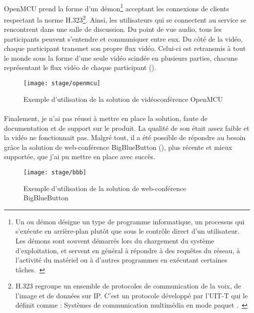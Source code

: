 \paragraph{}
OpenMCU prend la forme d'un démon\footnote{Un  ou démon désigne un type de programme informatique, un processus qui s'exécute en arrière-plan plutôt que sous le contrôle direct d'un utilisateur. Les démons sont souvent démarrés lors du chargement du système d'exploitation, et servent en général à répondre à des requêtes du réseau, à l'activité du matériel ou à d'autres programmes en exécutant certaines tâches.~\cite{demon}} acceptant les connexions de clients respectant la norme H.323\footnote{H.323 regroupe un ensemble de protocoles de communication de la voix, de l'image et de données sur IP. C'est un protocole développé par l'UIT-T qui le définit comme : \og Systèmes de communication multimédia en mode paquet \fg.~\cite{h323}}.
Ainsi, les utilisateurs qui se connectent au service se rencontrent dans une salle de discussion.
Du point de vue audio, tous les participants peuvent s'entendre et communiquer entre eux.
Du côté de la vidéo, chaque participant transmet son propre flux vidéo. Celui-ci est retransmis à tout le monde sous la forme d'une seule vidéo scindée en plusieurs parties, chacune représentant le flux vidéo de chaque participant ().

\begin{figure}
	\centering
	\texttt{[image: stage/openmcu]}
	\caption{Exemple d'utilisation de la solution de vidéoconférence OpenMCU}
	\label{figure:stage:openmcu}
\end{figure}

\paragraph{}
Finalement, je n'ai pas réussi à mettre en place la solution, faute de documentation et de support sur le produit.
La qualité de son était assez faible et la vidéo ne fonctionnait pas.
Malgré tout, il a été possible de répondre au besoin grâce la solution de web-conférence BigBlueButton (), plus récente et mieux supportée, que j'ai pu mettre en place avec succès.

\begin{figure}[htb]
	\centering
	\texttt{[image: stage/bbb]}
	\caption{Exemple d'utilisation de la solution de web-conférence BigBlueButton}
	\label{figure:stage:bbb}
\end{figure}

